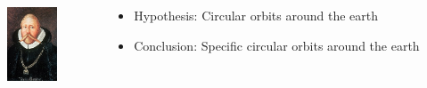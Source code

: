 \documentclass{beamer}
\newcommand{\pnote}[1] {}
\begin{document}
\begin{frame}
\begin{columns}
\begin{column}{0.5\textwidth}
    \end{column}
  \end{columns}
  \begin{columns}
    \begin{column}{0.1\textwidth}
      \includegraphics[width=4em]{figures/Tycho-Brahe.jpg}
    \end{column}
    \begin{column}{0.9\textwidth}
      \begin{itemize}
      \item Hypothesis: \alert{Circular} orbits around the \alert{earth}
      \item Conclusion: \alert{Specific} circular orbits around the earth
      \end{itemize}
    \end{column}
  \end{columns}
\end{frame}
\pnote{Let's take the example of planetary orbits. Here Tycho famously
 spent 20 years experimentally measuring the location of Mars. He
 had a hypothesis: that planetary orbits were circular, but he
 didn't know which were the right orbits. When he tried to fit his data to this hypothesis, he concluded a specific circular orbit for Mars... around Earth.}
\end{document}
